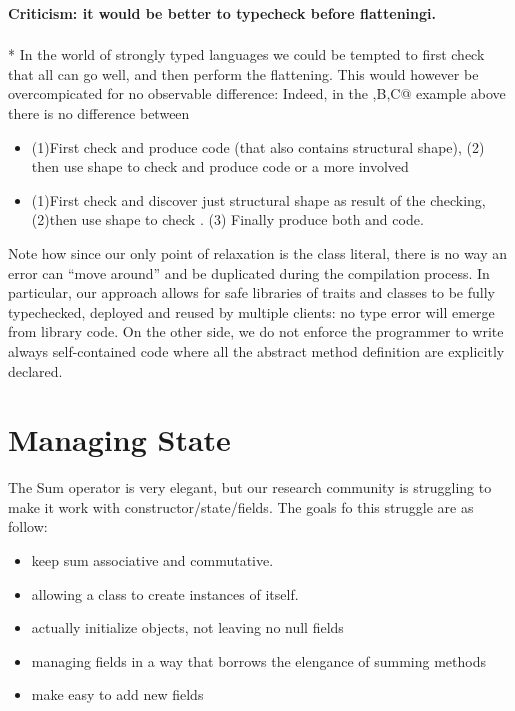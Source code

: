 \paragraph*{Criticism: it would be better to typecheck before flatteningi.}${}_{}$\\*
In the world of strongly typed languages we could be tempted to
first check that all can go well, and then perform the flattening.
This would however be overcompicated for no observable difference:
Indeed, in the \Q@A,B,C@ example above there is no difference
between
\begin{itemize}
\item  (1)First check \Q@B@ and produce \Q@B@ code (that also contains \Q@B@ structural shape),
  (2) then use \Q@B@ shape to check \Q@C@ and produce \Q@C@ code
or a more involved
\item  (1)First check \Q@B@ and discover just \Q@B@ structural shape as result of the checking,
  (2)then use \Q@B@ shape to check \Q@C@.
  (3) Finally produce both \Q@B@ and \Q@C@ code.
\end{itemize}

Note how since our only point of relaxation is the class literal, there is no way an error can ``move around'' and be duplicated during the compilation process.
In particular, our approach allows for safe libraries of traits and classes to be fully typechecked, deployed and reused by multiple clients: no type error will emerge from library code.
On the other side, we do not enforce the programmer to write always self-contained code where all the abstract method definition are explicitly declared.

\section{Managing State}

The Sum operator is very elegant, but our research community is struggling to
make it work with constructor/state/fields.
The goals fo this struggle are as follow:

\begin{itemize}

\item keep sum associative and commutative.
\item allowing a class to create instances of itself.
\item actually initialize objects, not leaving no null fields
\item managing fields in a way that borrows the elengance of summing methods
\item make easy to add new fields

\end{itemize}

